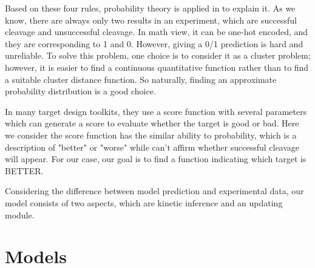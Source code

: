 \documentclass[a4paper,10pt]{article}
\begin{document}
	Based on these four rules, probability theory is applied in to explain it. As we know, there are always only two results in an experiment, which are successful cleavage and unsuccessful cleavage. In math view, it can be one-hot encoded, and they are corresponding to 1 and 0. 
	However, giving a 0/1 prediction is hard and unreliable.
	To solve this problem, one choice is to consider it as a cluster problem; however, it is easier to find a continuous quantitative function rather than to find a suitable cluster distance function. So naturally, finding an approximate probability distribution is a good choice. 
	
	In many target design toolkits, they use a score function with several parameters which can generate a score to evaluate whether the target is good or bad. Here we consider the score function has the similar ability to probability, which is a description of "better" or "worse" while can’t affirm whether successful cleavage will appear. For our case, our goal is to find a function indicating which target is BETTER.
	
	Considering the difference between model prediction and experimental data, our model consists of two aspects, which are kinetic inference and an updating module.
	
	\section{Models}
\end{document}
